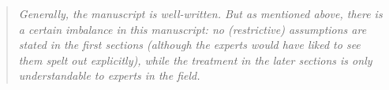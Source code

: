 \documentclass[10pt,parskip=full,foldmarks=off,addrfield=off,backaddress=false,refline=dateleft,letterpaper]{scrlttr2}
\newenvironment{reviewerquote}{\begin{quote}\color{DarkBlue}\itshape}{\end{quote}}
\begin{document}
\begin{letter}
\begin{reviewerquote}
Generally, the manuscript is well-written. But as mentioned above, there is a certain imbalance in this manuscript: no (restrictive) assumptions are stated in the first sections (although the experts would have liked to see them spelt out explicitly), while the treatment in the later sections is only understandable to experts in the field.

\end{reviewerquote}



\end{letter}
\end{document}
